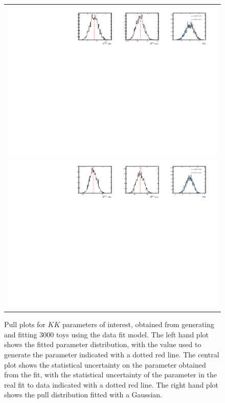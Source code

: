 \begin{figure}
\begin{tabular}{c}
\includegraphics[width=\textwidth]{ANA_resources/Plots/Data_fit/FitterBias//split//R_Bs_KK_run1.pdf} \\
\includegraphics[width=\textwidth]{ANA_resources/Plots/Data_fit/FitterBias//split//R_Bs_KK_run2.pdf} \\
  \end{tabular}
  \caption{Pull plots for $KK$ parameters of interest, obtained from generating and fitting 3000 toys using the data fit model. The left hand plot shows the fitted parameter distribution, with the value used to generate the parameter indicated with a dotted red line. The central plot shows the statistical uncertainty on the parameter obtained from the fit, with the statistical uncertainty of the parameter in the real fit to data indicated with a dotted red line. The right hand plot shows the pull distribution fitted with a Gaussian.}
\label{fig:KK/split/_pulls}
\end{figure}
